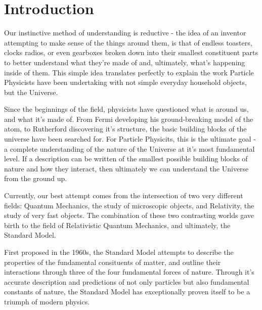 
\chapter{Introduction}  %

\ifpdf
    \graphicspath{{Chapter1/Figs/Raster/}{Chapter1/Figs/PDF/}{Chapter1/Figs/}}
\else
    \graphicspath{{Chapter1/Figs/Vector/}{Chapter1/Figs/}}
\fi


\label{sec:introduction_intro}

Our instinctive method of understanding is reductive - the idea of an
inventor attempting to make sense of the things around them, is
that of endless toasters, clocks radios, or even gearboxes broken down into
their smallest constituent parts to better understand what they're made of and,
ultimately, what's happening inside of them. This simple idea translates
perfectly to explain the work Particle Physicists have been undertaking with
not simple everyday household objects, but the Universe.

Since the beginnings of the field, physicists have questioned
what is
around us, and what it's made of. From Fermi developing his ground-breaking
model of the atom, to Rutherford discovering it's structure, the basic building
blocks of the universe have been searched for. For Particle Physicits, this is
the ultimate goal - a complete understanding of the nature of the Universe
at it's most
fundamental level. If a description can be written of the smallest possible
building blocks of
nature and how they interact, then ultimately we can understand
the Universe from the ground up.

Currently, our best attempt comes from the intersection of two very different
fields: Quantum Mechanics, the study of microscopic objects, and Relativity, the
study of very fast objects. The combination of these
two contrasting worlds gave birth to the field of Relativistic
Quantum Mechanics, and ultimately, the Standard Model.

First proposed in the 1960s, the Standard Model attempts to describe the
properties of the fundamental consituents of matter, and outline their
interactions through three of the four fundamental forces of nature. Through
it's accurate description and predictions of not only particles
but also fundamental constants of nature, the
Standard Model has exceptionally proven itself to be a triumph of
modern physics.

